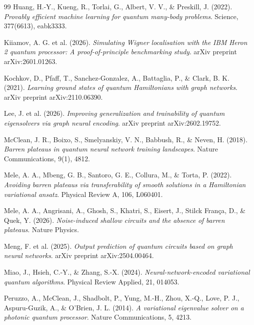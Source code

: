 \documentclass[11pt,a4paper,spanish]{book}
\begin{document}
\begin{thebibliography}{99}
 Huang, H.-Y., Kueng, R., Torlai, G., Albert, V. V., \& Preskill, J. (2022). \emph{Provably efficient machine learning for quantum many-body problems}. Science, 377(6613), eabk3333.

 Kiiamov, A. G. et al. (2026). \emph{Simulating Wigner localisation with the IBM Heron 2 quantum processor: A proof-of-principle benchmarking study}. arXiv preprint arXiv:2601.01263.

 Kochkov, D., Pfaff, T., Sanchez-Gonzalez, A., Battaglia, P., \& Clark, B. K. (2021). \emph{Learning ground states of quantum Hamiltonians with graph networks}. arXiv preprint arXiv:2110.06390.

 Lee, J. et al. (2026). \emph{Improving generalization and trainability of quantum eigensolvers via graph neural encoding}. arXiv preprint arXiv:2602.19752.

 McClean, J. R., Boixo, S., Smelyanskiy, V. N., Babbush, R., \& Neven, H. (2018). \emph{Barren plateaus in quantum neural network training landscapes}. Nature Communications, 9(1), 4812.

 Mele, A. A., Mbeng, G. B., Santoro, G. E., Collura, M., \& Torta, P. (2022). \emph{Avoiding barren plateaus via transferability of smooth solutions in a Hamiltonian variational ansatz}. Physical Review A, 106, L060401.

 Mele, A. A., Angrisani, A., Ghosh, S., Khatri, S., Eisert, J., Stilck França, D., \& Quek, Y. (2026). \emph{Noise-induced shallow circuits and the absence of barren plateaus}. Nature Physics.

 Meng, F. et al. (2025). \emph{Output prediction of quantum circuits based on graph neural networks}. arXiv preprint arXiv:2504.00464.

 Miao, J., Hsieh, C.-Y., \& Zhang, S.-X. (2024). \emph{Neural-network-encoded variational quantum algorithms}. Physical Review Applied, 21, 014053.

 Peruzzo, A., McClean, J., Shadbolt, P., Yung, M.-H., Zhou, X.-Q., Love, P. J., Aspuru-Guzik, A., \& O'Brien, J. L. (2014). \emph{A variational eigenvalue solver on a photonic quantum processor}. Nature Communications, 5, 4213.


\end{thebibliography}
\end{document}
